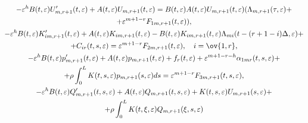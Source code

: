 \begin{gather*} 


-\varepsilon^h B(t,\varepsilon)U'_{m,r+1}(t,\varepsilon)+ 


A(t,\varepsilon)U_{m,r+1}(t,\varepsilon)=B(t,\varepsilon) 


A(t,\varepsilon)U_{m,r+1}(t,\varepsilon)


(\Lambda_{m,r+1}(\tau,\varepsilon)+ \\ 


% 


+\varepsilon^{m+1-r}F_{1m,r+1}(t,\varepsilon)), \\ 


% 


-\varepsilon^h B(t,\varepsilon)K'_{im,r+1}(t,\varepsilon)+ 


A(t,\varepsilon)K_{im,r+1}(t,\varepsilon)- 


B(t,\varepsilon)K_{im,r+1}(t,\varepsilon) 


\Lambda_{mi}(t-(r+1-i)\Delta,\varepsilon)+ \\ 


% 


+C_{ir}(t,s,\varepsilon)=\varepsilon^{m+1-r} 


F_{2m,r+1}(t,\varepsilon),\quad i=\ov{1,r}, \\ 


% 


-\varepsilon^h B(t,\varepsilon)p'_{m,r+1}(t,\varepsilon)+ 


A(t,\varepsilon)p_{m,r+1}(t,\varepsilon)+ 


f_r(t,\varepsilon)+\varepsilon^{m+1-r-h}\alpha_{1mr} 


(t,s,\varepsilon)+ \\ 


% 


+\rho\int^L_0 K(t,s,\varepsilon)p_{m,r+1}(s,\varepsilon)ds 


=\varepsilon^{m+1-r}F_{3m,r+1}(t,s,\varepsilon), \\ 


% 


-\varepsilon^h B(t,\varepsilon)Q'_{m,r+1}(t,s,\varepsilon) 


+A(t,\varepsilon)Q_{m,r+1}(t,s,\varepsilon)+ 


K(t,s,\varepsilon)U_{m,r+1}(s,\varepsilon)+ \\ 


% 


+\rho\int^L_0 K(t,\xi,\varepsilon)Q_{m,r+1}(\xi,s,\varepsilon) 



\end{gather*}
